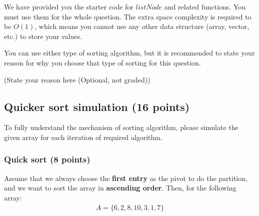 \documentclass[11pt]{exam}
\begin{document}
We have provided you the starter code for $listNode$ and related functions. You must use them for the whole question. The extra space complexity is required to be $O(1)$, which means you cannot use any other data structure (array, vector, etc.) to store your values.

You can use either type of sorting algorithm, but it is recommended to state your reason for why you choose that type of sorting for this question.

\begin{solution}
(State your reason here (Optional, not graded))
\end{solution}


\subsection{Quicker sort simulation (16 points)}
To fully understand the mechanism of sorting algorithm, please simulate the given array for each iteration of required algorithm.

\subsubsection{Quick sort (8 points)}

Assume that we always choose the \textbf{first entry} as the pivot to do the partition, and we want to sort the array in \textbf{ascending order}. Then, for the following array:
\begin{align*}
A = \{6, 2, 8, 10, 3, 1, 7\}
\end{align*}
\end{document}
